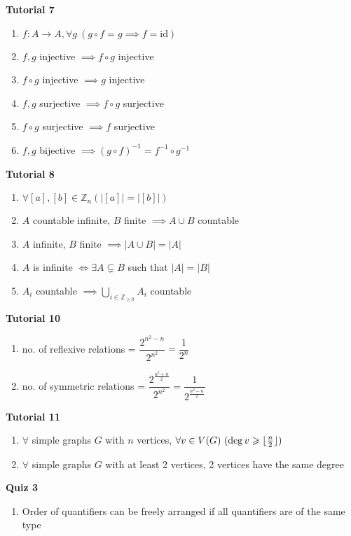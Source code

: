 \documentclass[landscape, a4paper]{article}
\DeclarePairedDelimiter\floor{\lfloor}{\rfloor}
\let\geq\geqslant
\newcommand{\Z}{\mathbb{Z}}
\newcommand{\heading}[1]{
    \noindent\textbf{#1}
}
\newenvironment{wenumerate}{\begin{enumerate}[wide, labelindent=2pt]}{\end{enumerate}}
\begin{document}
\begin{multicols*}{4}
\begin{enumerate}
    \end{enumerate}
    \heading{Tutorial 7}
    \begin{enumerate}
        \item $f:A\rightarrow A, \forall g\ (g\circ f=g\implies f=\text{id})$
        \item $f, g$ injective $\implies f\circ g$ injective
        \item $f\circ g$ injective $\implies g$ injective
        \item $f, g$ surjective $\implies f\circ g$ surjective
        \item $f\circ g$ surjective $\implies f$ surjective
        \item $f, g$ bijective $\implies (g\circ f)^{-1}=f^{-1}\circ g^{-1}$
    \end{enumerate}
    \heading{Tutorial 8}
    \begin{enumerate}
        \item $\forall [a],[b]\in \Z_n \left(|[a]|=|[b]|\right)$
        \item $A$ countable infinite, $B$ finite $\implies A\cup B$ countable
        \item $A$ infinite, $B$ finite $\implies |A\cup B|=|A|$
        \item $A$ is infinite $\iff \exists A\subsetneq B$ such that $|A|=|B|$
        \item $A_i$ countable $\implies \bigcup_{i\in\Z_{\geq 0}}A_i$ countable
    \end{enumerate}
    \heading{Tutorial 10}
    \begin{wenumerate}
        \item no. of reflexive relations = $\dfrac{2^{n^2-n}}{2^{n^2}}=\dfrac{1}{2^n}$
        \item no. of symmetric relations =        $\dfrac{2^{\frac{n^2+n}{2}}}{2^{n^2}}=\dfrac{1}{2^{\frac{n^2-n}{2}}}$
    \end{wenumerate}
    \heading{Tutorial 11}
    \begin{enumerate}
        \item $\forall$ simple graphs $G$ with $n$ vertices, $\forall v\in V(G)\ (\deg v\geq \floor{\frac{n}{2}})$
        \item $\forall$ simple graphs $G$ with at least 2 vertices, 2 vertices have the same degree
    \end{enumerate}
    \heading{Quiz 3}
    \begin{enumerate}
        \item Order of quantifiers can be freely arranged if all quantifiers are of the same type

\end{enumerate}
\end{multicols*}
\end{document}
